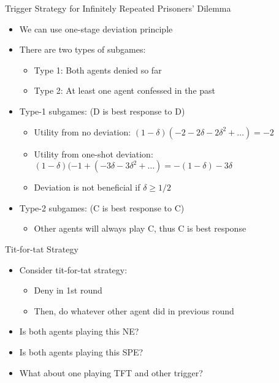 \documentclass[11pt,aspectratio=169,handout]{beamer}
\begin{document}
  
  \begin{frame}{Trigger Strategy for Infinitely Repeated Prisoners' Dilemma}
   \begin{itemize}[<+->]
   \setlength{\itemsep}{0.7em}
    \item We can use one-stage deviation principle
    \item There are two types of subgames:
    \begin{itemize}[<.->]
     \item Type 1: Both agents denied so far
     \item Type 2: At least one agent confessed in the past
    \end{itemize}
    \item Type-1 subgames: (D is best response to D)
    \begin{itemize}
     \item Utility from no deviation: $(1 - \delta) (-2 - 2\delta - 2\delta^{2} + \dots) = - 2$
     \item Utility from one-shot deviation: $(1 - \delta) (-1 + (-3\delta -3\delta^{2} + \dots) = - (1 - \delta ) - 3\delta$
     \item Deviation is not beneficial if $\delta  \geq  1/2$
    \end{itemize}
    \item Type-2 subgames: (C is best response to C)
    \begin{itemize}
     \item Other agents will always play C, thus C is best response
    \end{itemize}  
   \end{itemize}
  \end{frame}    
    
  \begin{frame}{Tit-for-tat Strategy}
   \begin{itemize}[<+->]
   \setlength{\itemsep}{1.2em}
    \item Consider \alert{tit-for-tat} strategy:
    \begin{itemize}[<.->]
     \item Deny in 1st round
     \item Then, do whatever other agent did in previous round
    \end{itemize}
    \item Is both agents playing this NE?
    \item Is both agents playing this SPE?
    \item What about one playing TFT and other trigger?
   \end{itemize}
  \end{frame}
  
\end{document}
